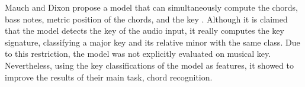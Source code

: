 Mauch and Dixon propose a model that can simultaneously
compute the chords, bass notes, metric position of the
chords, and the key \parencite{mauch2010simultaneous}.
Although it is claimed that the model detects the key of the
audio input, it really computes the key signature,
classifying a major key and its relative minor with the same
class. Due to this restriction, the model was not explicitly
evaluated on musical key. Nevertheless, using the key
classifications of the model as features, it showed to
improve the results of their main task, chord recognition.













